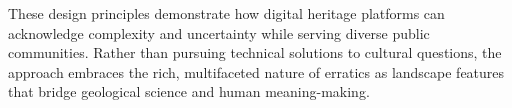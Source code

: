 These design principles demonstrate how digital heritage platforms can acknowledge complexity and uncertainty while serving diverse public communities. Rather than pursuing technical solutions to cultural questions, the approach embraces the rich, multifaceted nature of erratics as landscape features that bridge geological science and human meaning-making.
